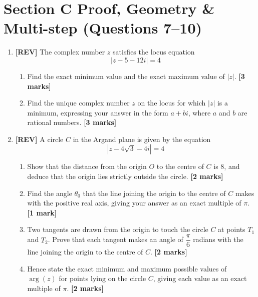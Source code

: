 \documentclass[11pt,a4paper]{article}
\begin{document}
\section*{Section C \quad Proof, Geometry \& Multi-step \hfill{\normalfont\footnotesize(Questions 7--10)}}
\begin{enumerate}[resume]

\item \textbf{[REV]} The complex number $z$ satisfies the locus equation
\[
|z - 5 - 12i| = 4
\]
\begin{enumerate}[label=(\alph*)]
  \item Find the exact minimum value and the exact maximum value of $|z|$. \hfill{\textbf{[3 marks]}}
  \item Find the unique complex number $z$ on the locus for which $|z|$ is a minimum, expressing your answer in the form $a + bi$, where $a$ and $b$ are rational numbers. \hfill{\textbf{[3 marks]}}
\end{enumerate}

\item \textbf{[REV]} A circle $C$ in the Argand plane is given by the equation
\[
|z - 4\sqrt{3} - 4i| = 4
\]
\begin{enumerate}[label=(\alph*)]
  \item Show that the distance from the origin $O$ to the centre of $C$ is 8, and deduce that the origin lies strictly outside the circle. \hfill{\textbf{[2 marks]}}
  \item Find the angle $\theta_0$ that the line joining the origin to the centre of $C$ makes with the positive real axis, giving your answer as an exact multiple of $\pi$. \hfill{\textbf{[1 mark]}}
  \item Two tangents are drawn from the origin to touch the circle $C$ at points $T_1$ and $T_2$. Prove that each tangent makes an angle of $\dfrac{\pi}{6}$ radians with the line joining the origin to the centre of $C$. \hfill{\textbf{[2 marks]}}
  \item Hence state the exact minimum and maximum possible values of $\arg(z)$ for points lying on the circle $C$, giving each value as an exact multiple of $\pi$. \hfill{\textbf{[2 marks]}}
\end{enumerate}


\end{enumerate}
\end{document}
